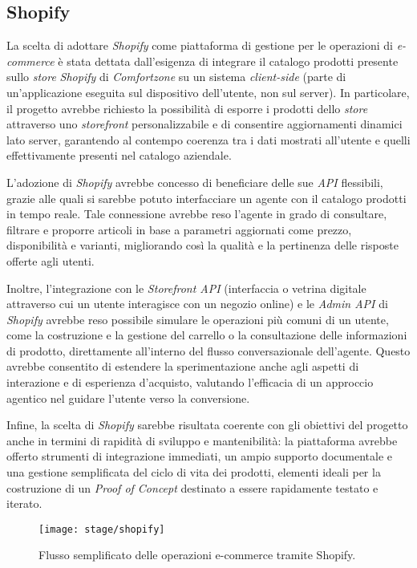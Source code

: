 \subsection{Shopify}

La scelta di adottare \emph{Shopify} come piattaforma di gestione per le operazioni di \emph{e-commerce} è stata dettata dall’esigenza di integrare il catalogo prodotti presente 
sullo \emph{store} \emph{Shopify} di \emph{Comfortzone} su un sistema \emph{client-side} (parte di un’applicazione eseguita sul dispositivo dell’utente, non sul server). In particolare, il progetto avrebbe richiesto la possibilità di esporre i prodotti dello \emph{store} 
attraverso uno \emph{storefront} personalizzabile e di consentire aggiornamenti dinamici lato server, garantendo al contempo coerenza tra i dati mostrati all’utente e quelli effettivamente 
presenti nel catalogo aziendale.

L’adozione di \emph{Shopify} avrebbe concesso di beneficiare delle sue \emph{API} flessibili, grazie alle quali si sarebbe potuto interfacciare un agente con il catalogo prodotti in tempo reale. 
Tale connessione avrebbe reso l’agente in grado di consultare, filtrare e proporre articoli in base a parametri aggiornati come prezzo, disponibilità e varianti, 
migliorando così la qualità e la pertinenza delle risposte offerte agli utenti.

Inoltre, l’integrazione con le \emph{Storefront API} (interfaccia o vetrina digitale attraverso cui un utente interagisce con un negozio online) e le \emph{Admin API} di \emph{Shopify} avrebbe reso possibile simulare le operazioni più comuni di un utente, come la 
costruzione e la gestione del carrello o la consultazione delle informazioni di prodotto, direttamente all’interno del flusso conversazionale dell’agente. Questo avrebbe consentito di 
estendere la sperimentazione anche agli aspetti di interazione e di esperienza d’acquisto, valutando l’efficacia di un approccio agentico nel guidare l’utente verso la conversione.

Infine, la scelta di \emph{Shopify} sarebbe risultata coerente con gli obiettivi del progetto anche in termini di rapidità di sviluppo e mantenibilità: 
la piattaforma avrebbe offerto strumenti di integrazione immediati, un ampio supporto documentale e una gestione semplificata del ciclo di vita dei prodotti, 
elementi ideali per la costruzione di un \emph{Proof of Concept} destinato a essere rapidamente testato e iterato.

\begin{figure}[H]
    \centering
    \texttt{[image: stage/shopify]}
    \caption{Flusso semplificato delle operazioni e-commerce tramite Shopify.}
    \label{fig:shopify}
\end{figure}
